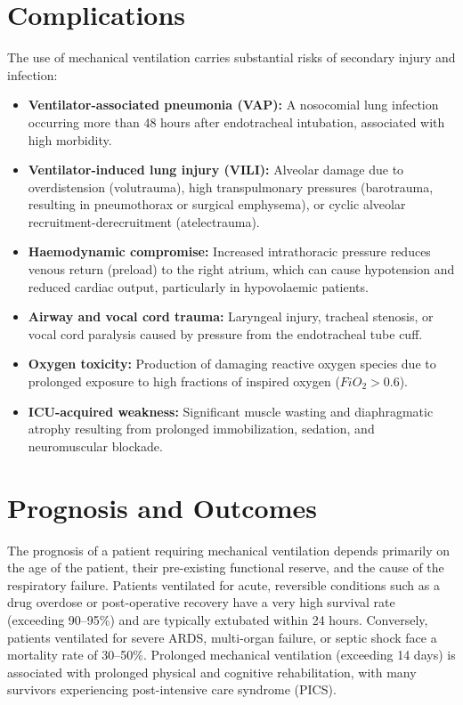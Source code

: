 \section*{Complications}
The use of mechanical ventilation carries substantial risks of secondary injury and infection:
\begin{itemize}
    \item \textbf{Ventilator-associated pneumonia (VAP):} A nosocomial lung infection occurring more than 48 hours after endotracheal intubation, associated with high morbidity.
    \item \textbf{Ventilator-induced lung injury (VILI):} Alveolar damage due to overdistension (volutrauma), high transpulmonary pressures (barotrauma, resulting in pneumothorax or surgical emphysema), or cyclic alveolar recruitment-derecruitment (atelectrauma).
    \item \textbf{Haemodynamic compromise:} Increased intrathoracic pressure reduces venous return (preload) to the right atrium, which can cause hypotension and reduced cardiac output, particularly in hypovolaemic patients.
    \item \textbf{Airway and vocal cord trauma:} Laryngeal injury, tracheal stenosis, or vocal cord paralysis caused by pressure from the endotracheal tube cuff.
    \item \textbf{Oxygen toxicity:} Production of damaging reactive oxygen species due to prolonged exposure to high fractions of inspired oxygen ($FiO_2 >0.6$).
    \item \textbf{ICU-acquired weakness:} Significant muscle wasting and diaphragmatic atrophy resulting from prolonged immobilization, sedation, and neuromuscular blockade.
\end{itemize}

\section*{Prognosis and Outcomes}
The prognosis of a patient requiring mechanical ventilation depends primarily on the age of the patient, their pre-existing functional reserve, and the cause of the respiratory failure. Patients ventilated for acute, reversible conditions such as a drug overdose or post-operative recovery have a very high survival rate (exceeding 90--95\%) and are typically extubated within 24 hours. Conversely, patients ventilated for severe ARDS, multi-organ failure, or septic shock face a mortality rate of 30--50\%. Prolonged mechanical ventilation (exceeding 14 days) is associated with prolonged physical and cognitive rehabilitation, with many survivors experiencing post-intensive care syndrome (PICS).

